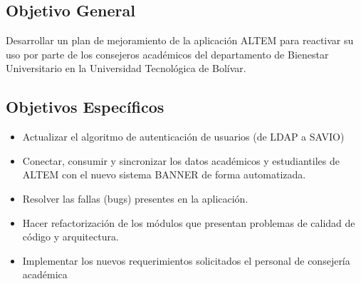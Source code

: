 \subsection{Objetivo General}
Desarrollar un plan de mejoramiento de la aplicación ALTEM para reactivar su uso por parte de los consejeros académicos del departamento de Bienestar Universitario en la Universidad Tecnológica de Bolívar.

\subsection{Objetivos Específicos}
\begin{itemize}
    \item Actualizar el algoritmo de autenticación de usuarios (de LDAP a SAVIO)
    \item Conectar, consumir y sincronizar los datos académicos y estudiantiles de ALTEM con el nuevo sistema BANNER de forma automatizada.
    \item Resolver las fallas (bugs) presentes en la aplicación.
    \item Hacer refactorización de los módulos que presentan problemas de calidad de código y arquitectura.
    \item Implementar los nuevos requerimientos solicitados el personal de consejería académica
\end{itemize}